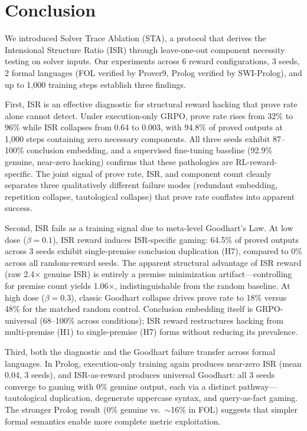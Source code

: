 \section{Conclusion}
\label{sec:conclusion}

We introduced Solver Trace Ablation (STA), a protocol that derives the Intensional Structure Ratio (ISR) through leave-one-out component necessity testing on solver inputs.
Our experiments across 6 reward configurations, 3 seeds, 2 formal languages (FOL verified by Prover9, Prolog verified by SWI-Prolog), and up to 1{,}000 training steps establish three findings.

First, ISR is an effective diagnostic for structural reward hacking that prove rate alone cannot detect.
Under execution-only GRPO, prove rate rises from 32\% to 96\% while ISR collapses from 0.64 to 0.003, with 94.8\% of proved outputs at 1{,}000 steps containing zero necessary components.
All three seeds exhibit 87--100\% conclusion embedding, and a supervised fine-tuning baseline (92.9\% genuine, near-zero hacking) confirms that these pathologies are RL-reward-specific.
The joint signal of prove rate, ISR, and component count cleanly separates three qualitatively different failure modes (redundant embedding, repetition collapse, tautological collapse) that prove rate conflates into apparent success.

Second, ISR fails as a training signal due to meta-level Goodhart's Law.
At low dose ($\beta{=}0.1$), ISR reward induces ISR-specific gaming: 64.5\% of proved outputs across 3 seeds exhibit single-premise conclusion duplication (H7), compared to 0\% across all random-reward seeds.
The apparent structural advantage of ISR reward (raw 2.4$\times$ genuine ISR) is entirely a premise minimization artifact---controlling for premise count yields 1.06$\times$, indistinguishable from the random baseline.
At high dose ($\beta{=}0.3$), classic Goodhart collapse drives prove rate to 18\% versus 48\% for the matched random control.
Conclusion embedding itself is GRPO-universal (68--100\% across conditions); ISR reward restructures hacking from multi-premise (H1) to single-premise (H7) forms without reducing its prevalence.

Third, both the diagnostic and the Goodhart failure transfer across formal languages.
In Prolog, execution-only training again produces near-zero ISR (mean 0.04, 3 seeds), and ISR-as-reward produces universal Goodhart: all 3 seeds converge to gaming with 0\% genuine output, each via a distinct pathway---tautological duplication, degenerate uppercase syntax, and query-as-fact gaming.
The stronger Prolog result (0\% genuine vs.\ ${\sim}$16\% in FOL) suggests that simpler formal semantics enable more complete metric exploitation.

